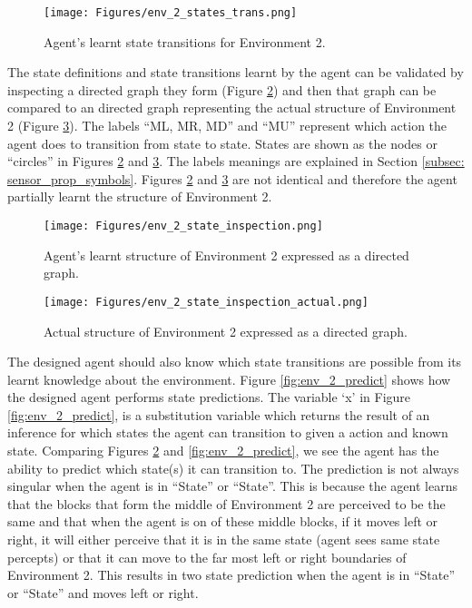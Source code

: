 \begin{figure}[H]
    \centering
    \texttt{[image: Figures/env\_2\_states\_trans.png]}
    \caption{Agent's learnt state transitions for Environment 2.}
    \label{fig:env_2_state_def_transitions}
\end{figure}


The state definitions and state transitions learnt by the agent can be validated by inspecting a directed graph they form (Figure \ref{fig:env_2_learnt}) and then that graph can be compared to an directed graph representing the actual structure of Environment 2 (Figure \ref{fig:env_2_actual}). The labels ``ML, MR, MD'' and ``MU'' represent which action the agent does to transition from state to state. States  are shown as the nodes or ``circles'' in Figures \ref{fig:env_2_learnt} and \ref{fig:env_2_actual}. The labels meanings are explained in Section \ref{subsec: sensor_prop_symbols}. Figures \ref{fig:env_2_learnt} and \ref{fig:env_2_actual} are not identical and therefore the agent partially learnt the structure of Environment 2.

\begin{figure}[H]
    \centering
    \texttt{[image: Figures/env\_2\_state\_inspection.png]}
    \caption{Agent's learnt structure of Environment 2 expressed as a directed graph.}
    \label{fig:env_2_learnt}
\end{figure}

\begin{figure}[H]
    \centering
    \texttt{[image: Figures/env\_2\_state\_inspection\_actual.png]}
    \caption{Actual structure of Environment 2 expressed as a directed graph.}
    \label{fig:env_2_actual}
\end{figure}

The designed agent should also know which state transitions are possible from its learnt knowledge about the environment. Figure \ref{fig:env_2_predict} shows how the designed agent performs state predictions. The variable `x' in Figure \ref{fig:env_2_predict}, is a substitution variable which returns the result of an inference for which states the agent can transition to given a action and known state. Comparing Figures \ref{fig:env_2_learnt} and \ref{fig:env_2_predict}, we see the agent has the ability to predict which state(s) it can transition to. The prediction is not always singular when the agent is in ``State'' or ``State''. This is because the agent learns that the blocks that form the middle of Environment 2 are perceived to be the same and that when the agent is on of these middle blocks, if it moves left or right, it will either perceive that it is in the same state (agent sees same state percepts) or that it can move to the far most left or right boundaries of Environment 2. 
This results in two state prediction when the agent is in ``State'' or ``State'' and moves left or right. 	

